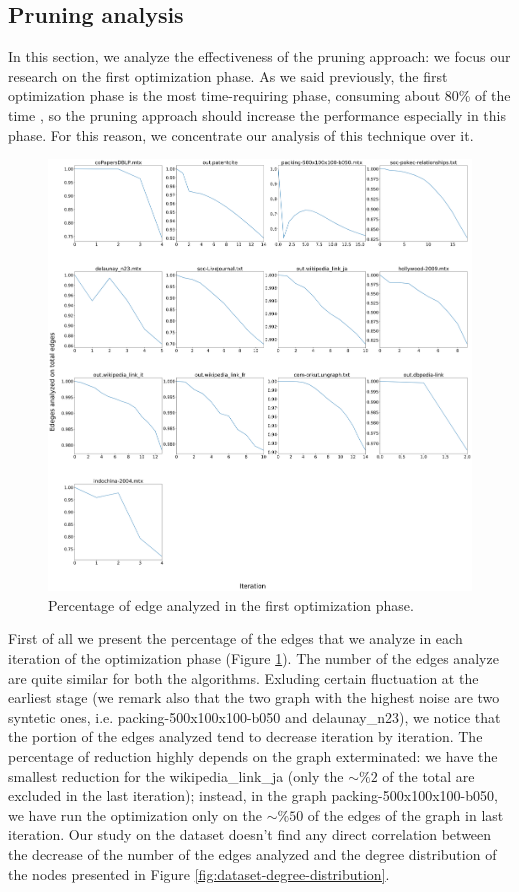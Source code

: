 \subsection{Pruning analysis}
In this section, we analyze the effectiveness of the pruning approach: we focus our research on the first optimization phase. As we said previously, the first optimization phase is the most time-requiring phase, consuming about 80\% of the time \cite{wickramaarachchi2014fast}, so the pruning approach should increase the performance especially in this phase. For this reason, we concentrate our analysis of this technique over it.
\begin{figure}[h]
	\centering
	\includegraphics[width=1\linewidth]{0-resources/edge-percentage}
	\caption{Percentage of edge analyzed in the first optimization phase.}
	\label{fig:edge-percentage}
\end{figure}
First of all we present the percentage of the edges that we analyze in each iteration of the optimization phase (Figure \ref{fig:edge-percentage}). The number of the edges analyze are quite similar for both the algorithms. Exluding certain fluctuation at the earliest stage (we remark also that the two graph with the highest noise are two syntetic ones, i.e. packing-500x100x100-b050 and delaunay\_n23), we notice that the portion of the edges analyzed tend to decrease iteration by iteration. The percentage of reduction highly depends on the graph exterminated: we have the smallest reduction for the wikipedia\_link\_ja (only the $\sim\%2$ of the total are excluded in the last iteration); instead, in the graph packing-500x100x100-b050, we have run the optimization only on the $\sim\%50$ of the edges of the graph in last iteration. Our study on the dataset doesn't find any direct correlation between the decrease of the number of the edges analyzed and the degree distribution of the nodes presented in Figure \ref{fig:dataset-degree-distribution}.
